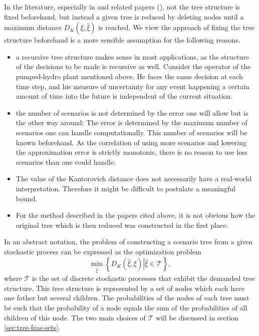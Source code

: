 In the literature, especially in \cite{Heitsch2009} and related papers (\cite{Dupacova2003,Heitsch2003,Heitsch2009a,Heitsch2010}), not the tree structure is fixed beforehand, but instead a given tree is reduced by deleting nodes until a maximum distance $D_K(\xi,\hat{\xi})$ is reached.
We view the approach of fixing the tree structure beforehand is a more sensible assumption for the following reasons.
\begin{itemize}
\item a recursive tree structure makes sense in most applications, as the structure of the decisions to be made is recursive as well. Consider the operator of the pumped-hydro plant mentioned above. He faces the same decision at each time step, and his measure of uncertainty for any event happening a certain amount of time into the future is independent of the current situation.
\item the number of scenarios is not determined by the error one will allow but is the other way around: The error is determined by the maximum number of scenarios one can handle computationally. This number of scenarios will be known beforehand. As the correlation of using more scenarios and lowering the approximation error is strictly monotonic, there is no reason to use less scenarios than one could handle.
\item The value of the Kantorovich distance does not necessarily have a real-world interpretation. Therefore it might be difficult to postulate a meaningful bound.
\item For the method described in the papers cited above, it is not obvious how the original tree which is then reduced was constructed in the first place.
\end{itemize}

In an abstract notation, the problem of constructing a scenario tree from a given stochastic process can be expressed as the optimization problem
\begin{equation}
  \label{eq:symbolic-optimization-problem}
  \min_{\hat{\xi}}\left\{D_K(\hat{\xi}, \xi)\left|\hat{\xi} \in \mathcal{T}\right.\right\},
\end{equation}
where $\mathcal{T}$ is the set of discrete stochastic processes that exhibit the demanded tree structure.
This tree structure is represented by a set of nodes which each have one father but several children.
The probabilities of the nodes of each tree must be such that the probability of a node equals the sum of the probabilities of all children of this node. The two main choices of $\mathcal{T}$ will be discussed in section \ref{sec:tree-feas-sets}.

